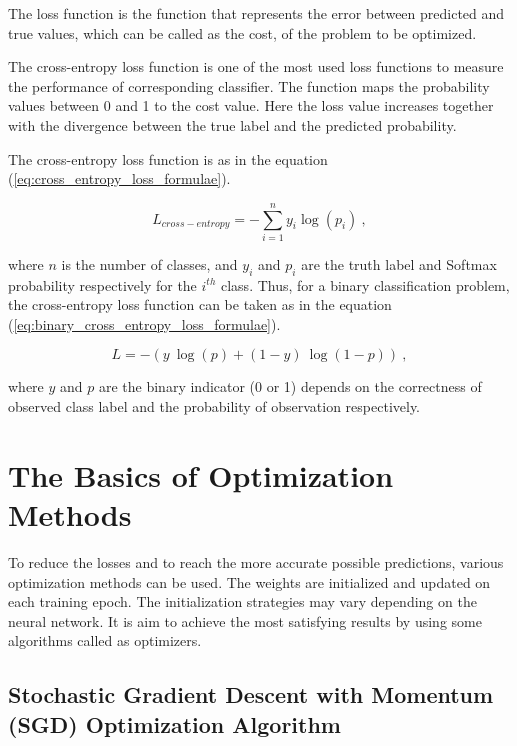The loss function is the function that represents the error between predicted and true values, which can be called as the cost, of the problem to be optimized.

The cross-entropy loss function is one of the most used loss functions to measure the performance of corresponding classifier. The function maps the probability values between 0 and 1 to the cost value. Here the loss value increases together with the divergence between the true label and the predicted probability.

The cross-entropy loss function is as in the equation (\ref{eq:cross_entropy_loss_formulae}).

\begin{equation}
\label{eq:cross_entropy_loss_formulae}
    L_{cross-entropy} = - \sum_{i=1}^{n} y_{i} \log(p_{i}) \:,
\end{equation}

where $n$ is the number of classes, and $y_{i}$ and $p_{i}$ are the truth label and Softmax probability respectively for the $i^{th}$ class. Thus, for a binary classification problem, the cross-entropy loss function can be taken as in the equation (\ref{eq:binary_cross_entropy_loss_formulae}).

\begin{equation}
\label{eq:binary_cross_entropy_loss_formulae}
    L = - \left ( y\:\log(p) + (1 - y)\:\log(1-p) \right ) \:,
\end{equation}

where $y$ and $p$ are the binary indicator (0 or 1) depends on the correctness of observed class label and the probability of observation respectively.

\section{The Basics of Optimization Methods}
\label{sec:CH3_the_basics_of_optimization}

To reduce the losses and to reach the more accurate possible predictions, various optimization methods can be used. The weights are initialized and updated on each training epoch. The initialization strategies may vary depending on the neural network. It is aim to achieve the most satisfying results by using some algorithms called as optimizers.

\subsection{Stochastic Gradient Descent with Momentum (SGD) Optimization Algorithm}

